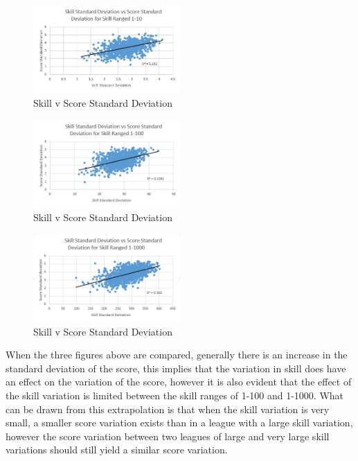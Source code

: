 \documentclass[12pt]{article}
\begin{document}
\begin{figure}[H]
\centering
\includegraphics[width=0.5\textwidth]{skill_score_1.jpg}
\caption{Skill v Score Standard Deviation}
\end{figure}

\begin{figure}[H]
\centering
\includegraphics[width=0.5\textwidth]{skill_score_2.jpg}
\caption{Skill v Score Standard Deviation}
\end{figure}

\begin{figure}[H]
\centering
\includegraphics[width=0.5\textwidth]{skill_score_3.jpg}
\caption{Skill v Score Standard Deviation}
\end{figure}

When the three figures above are compared, generally there is an increase in the standard deviation of the score, this implies that the variation in skill does have an effect on the variation of the score, however it is also evident that the effect of the skill variation is limited between the skill ranges of 1-100 and 1-1000. What can be drawn from this extrapolation is that when the skill variation is very small, a smaller score variation exists than in a league with a large skill variation, however the score variation between two leagues of large and very large skill variations should still yield a similar score variation.
\clearpage
\end{document}
